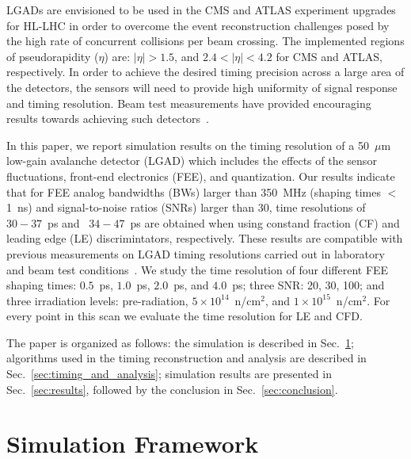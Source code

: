 \documentclass[preprint,1p]{elsarticle}
\begin{document}
LGADs are envisioned to be used in the CMS and ATLAS experiment upgrades for HL-LHC in order to overcome
the event reconstruction challenges posed by the high rate of concurrent
collisions per beam crossing. The implemented regions of pseudorapidity ($\eta$)
are: $|\eta|>1.5$, and $2.4 < |\eta| < 4.2 $ for CMS and ATLAS, respectively. In
order to achieve the desired timing precision across a large area of the
detectors, the sensors will need to provide high uniformity of signal response
and timing resolution. Beam test measurements have provided encouraging results towards achieving
such detectors~\cite{Apresyan:2018oln}.

In this paper, we report simulation results on the
timing resolution of a 50~$\mu$m low-gain avalanche detector (LGAD) which includes
the effects of the sensor fluctuations, front-end electronics (FEE), and quantization.
Our results indicate that for FEE analog bandwidths (BWs) larger than 350~\si{MHz} (shaping times $<$ 1~\si{ns}) and signal-to-noise ratios
(SNRs) larger than 30, time resolutions of ~$30-37$~\si{ps} and ~$34-47$~\si{ps}
are obtained when using constand fraction (CF) and leading edge (LE) discrimintators, respectively. These results are
compatible with previous measurements on LGAD timing resolutions carried out in laboratory and beam test
conditions~\cite{Apresyan:2018oln, Cartiglia201783, PELLEGRINI201412}. We study the time resolution of four
different FEE shaping times: $0.5$~\si{ps}, $1.0$~\si{ps}, $2.0$~\si{ps}, and $4.0$~\si{ps}; three SNR: 20, 30, 100; and three
irradiation levels: pre-radiation, $5\times 10^{14}$~n/cm$^2$, and $1\times 10^{15}$~n/cm$^2$. For every point in this scan we
 evaluate the time resolution for LE and CFD.

The paper is organized as follows: the simulation is described in
Sec.~\ref{sec:simulation}; algorithms used in the timing
reconstruction and analysis are described in Sec.~\ref{sec:timing_and_analysis}; simulation results
are presented in Sec.~\ref{sec:results}, followed by the conclusion in
Sec.~\ref{sec:conclusion}.

\section{Simulation Framework}
\label{sec:simulation}

\end{document}
